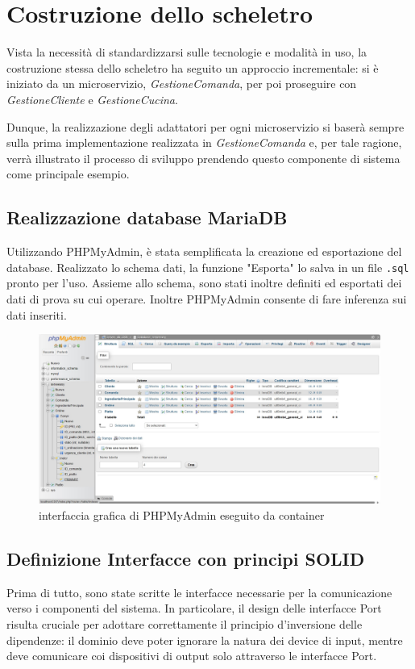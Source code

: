 \section{Costruzione dello scheletro}
Vista la necessità di standardizzarsi sulle tecnologie e modalità in uso, la costruzione stessa dello scheletro 
ha seguito un approccio incrementale: si è iniziato da un microservizio, \textit{GestioneComanda}, per poi proseguire con \textit{GestioneCliente} e \textit{GestioneCucina}.

Dunque, la realizzazione degli adattatori per ogni microservizio si baserà sempre sulla prima implementazione realizzata in \textit{GestioneComanda} e, per tale ragione, verrà illustrato il processo di sviluppo prendendo questo componente di sistema come principale esempio.

\subsection{Realizzazione database MariaDB}
Utilizzando PHPMyAdmin, è stata semplificata la creazione ed esportazione del database. Realizzato lo schema dati, la funzione "Esporta" lo salva in un file \texttt{.sql} 
pronto per l'uso. Assieme allo schema, sono stati inoltre definiti ed esportati dei dati di prova su cui operare. Inoltre PHPMyAdmin consente di fare inferenza sui dati inseriti.

\begin{figure}[htbp]
	\centering
	\includegraphics[scale=0.36]{iterazione1/images/phpmyadmin.jpg}
	\caption{interfaccia grafica di PHPMyAdmin eseguito da container
 \label{fig:phpmyadmin}}
\end{figure}


\subsection{Definizione Interfacce con principi SOLID}
Prima di tutto, sono state scritte le interfacce necessarie per la comunicazione verso i componenti del sistema. 
In particolare, il design delle interfacce Port risulta cruciale per adottare correttamente il principio d'inversione delle dipendenze: 
il dominio deve poter ignorare la natura dei device di input, mentre deve comunicare coi dispositivi di output solo attraverso le interfacce Port.


